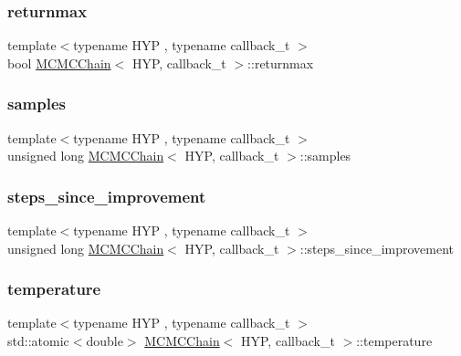 \subsubsection{\texorpdfstring{returnmax}{returnmax}}
{\footnotesize\ttfamily template$<$typename H\+YP , typename callback\+\_\+t $>$ \\
bool \hyperlink{class_m_c_m_c_chain}{M\+C\+M\+C\+Chain}$<$ H\+YP, callback\+\_\+t $>$\+::returnmax}

\mbox{\label{class_m_c_m_c_chain_a0d3ac649b04077cd0ffea236df560c91}} 
\subsubsection{\texorpdfstring{samples}{samples}}
{\footnotesize\ttfamily template$<$typename H\+YP , typename callback\+\_\+t $>$ \\
unsigned long \hyperlink{class_m_c_m_c_chain}{M\+C\+M\+C\+Chain}$<$ H\+YP, callback\+\_\+t $>$\+::samples}

\mbox{\label{class_m_c_m_c_chain_aeac1cd63d13c397ba01cca35b605b786}} 
\subsubsection{\texorpdfstring{steps\+\_\+since\+\_\+improvement}{steps\_since\_improvement}}
{\footnotesize\ttfamily template$<$typename H\+YP , typename callback\+\_\+t $>$ \\
unsigned long \hyperlink{class_m_c_m_c_chain}{M\+C\+M\+C\+Chain}$<$ H\+YP, callback\+\_\+t $>$\+::steps\+\_\+since\+\_\+improvement}

\mbox{\label{class_m_c_m_c_chain_a7173287e1c0e681a9912a84c87320ece}} 
\subsubsection{\texorpdfstring{temperature}{temperature}}
{\footnotesize\ttfamily template$<$typename H\+YP , typename callback\+\_\+t $>$ \\
std\+::atomic$<$double$>$ \hyperlink{class_m_c_m_c_chain}{M\+C\+M\+C\+Chain}$<$ H\+YP, callback\+\_\+t $>$\+::temperature}

